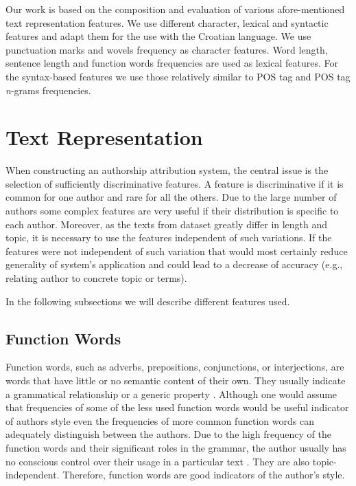 \documentclass{llncs}
\begin{document}
Our work is based on the composition and evaluation of various afore-mentioned
text representation features. We use different character, lexical and syntactic
features and adapt them for the use with the Croatian language. We use
punctuation marks and wovels frequency as character features. Word length,
sentence length and function words frequencies are used as lexical features. For
the syntax-based features we use those relatively similar to POS tag and POS tag
\emph{n}-grams frequencies.


\section{Text Representation}
When constructing an authorship attribution system, the central issue is the
selection of sufficiently discriminative features. A feature is discriminative if
it is common for one author and rare for all the others. Due to the large number
of authors some complex features are very useful if their distribution is
specific to each author. Moreover, as the texts from dataset greatly differ in
length and topic, it is necessary to use the features independent of such
variations. If the features were not independent of such variation that
would most certainly reduce generality of system's application and could lead
to a decrease of accuracy (e.g., relating author to concrete topic or terms).

In the following subsections we will describe different features used.

\subsection{Function Words}
\label{sec:funkcijske-rijeci}
Function words, such as adverbs, prepositions, conjunctions, or interjections,
are words that have little or no semantic content of their own. They usually
indicate a grammatical relationship or a generic property
\cite{zhao2005effective}. Although one would assume that frequencies of some of
the less used function words would be useful indicator of authors style even the
frequencies of more common function words can adequately distinguish between the
authors. Due to the high frequency of the function words and their significant
roles in the grammar, the author usually has no conscious control over their
usage in a particular text \cite{argamon2005measuring}. They are also
topic-independent. Therefore, function words are good indicators of the author's
style.
\end{document}
